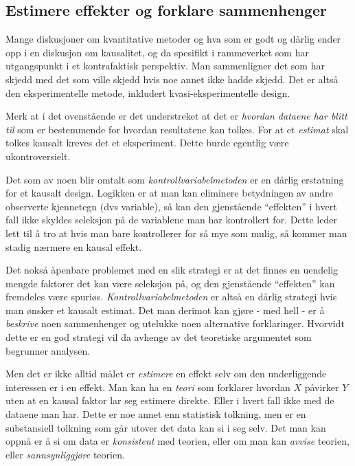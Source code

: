 \documentclass[
  letterpaper,
  DIV=11,
  numbers=noendperiod]{scrreprt}
\begin{document}
\hypertarget{estimere-effekter-og-forklare-sammenhenger}{%
\subsection{Estimere effekter og forklare
sammenhenger}\label{estimere-effekter-og-forklare-sammenhenger}}

Mange diskusjoner om kvantitative metoder og hva som er godt og dårlig
ender opp i en diskusjon om kausalitet, og da spesifikt i rammeverket
som har utgangspunkt i et kontrafaktisk perspektiv. Man sammenligner det
som har skjedd med det som ville skjedd hvis noe annet ikke hadde
skjedd. Det er altså den eksperimentelle metode, inkludert
kvasi-eksperimentelle design.

Merk at i det ovenstående er det understreket at det er \emph{hvordan
dataene har blitt til} som er bestemmende for hvordan resultatene kan
tolkes. For at et \emph{estimat} skal tolkes kausalt kreves det et
eksperiment. Dette burde egentlig være ukontroversielt.

Det som av noen blir omtalt som \emph{kontrollvariabelmetoden} er en
dårlig erstatning for et kausalt design. Logikken er at man kan
eliminere betydningen av andre observerte kjennetegn (dvs variable), så
kan den gjenstående ``effekten'' i hvert fall ikke skyldes seleksjon på
de variablene man har kontrollert for. Dette leder lett til å tro at
hvis man bare kontrollerer for så mye som mulig, så kommer man stadig
nærmere en kausal effekt.

Det nokså åpenbare problemet med en slik strategi er at det finnes en
uendelig mengde faktorer det kan være seleksjon på, og den gjenstående
``effekten'' kan fremdeles være spuriøs. \emph{Kontrollvariabelmetoden}
er altså en dårlig strategi hvis man ønsker et kausalt estimat. Det man
derimot kan gjøre - med hell - er å \emph{beskrive} noen sammenhenger og
utelukke noen alternative forklaringer. Hvorvidt dette er en god
strategi vil da avhenge av det teoretiske argumentet som begrunner
analysen.

Men det er ikke alltid målet er \emph{estimere} en effekt selv om den
underliggende interessen er i en effekt. Man kan ha en \emph{teori} som
forklarer hvordan \(X\) påvirker \(Y\) uten at en kausal faktor lar seg
estimere direkte. Eller i hvert fall ikke med de dataene man har. Dette
er noe annet enn statistisk tolkning, men er en substansiell tolkning
som går utover det data kan si i seg selv. Det man kan oppnå er å si om
data er \emph{konsistent} med teorien, eller om man kan \emph{avvise}
teorien, eller \emph{sannsynliggjøre} teorien.
\end{document}

